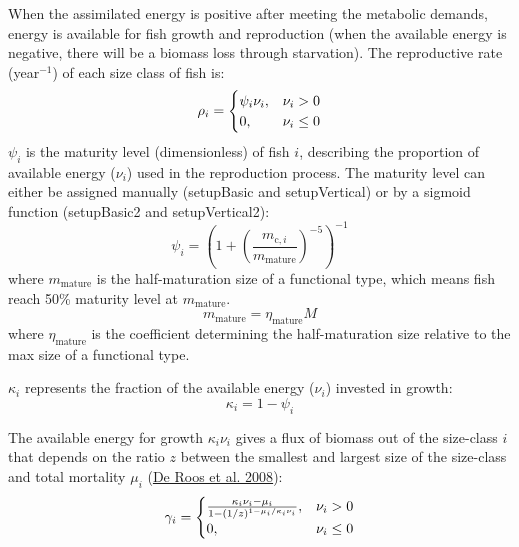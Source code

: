 \documentclass[
]{article}
\begin{document}
When the assimilated energy is positive after meeting the metabolic
demands, energy is available for fish growth and reproduction (when the
available energy is negative, there will be a biomass loss through
starvation). The reproductive rate (year\(^{-1}\)) of each size class of
fish is: \begin{equation}
\rho_i =
  \begin{cases}
 \psi_i \nu_i, & \text{$ \nu_i > 0 $}   \\
     0, & \text{$ \nu_i \leq 0 $} 
  \end{cases}
\end{equation} \(\psi_i\) is the maturity level (dimensionless) of fish
\(i\), describing the proportion of available energy (\(\nu_{i}\)) used
in the reproduction process. The maturity level can either be assigned
manually (setupBasic and setupVertical) or by a sigmoid function
(setupBasic2 and setupVertical2): \begin{equation}
\psi_i = \left(1+\left(\frac{m_{\mathrm{c},i}}{m_{\mathrm{mature}}}\right)^{-5} \right)^{-1}
\end{equation} where \(m_{\mathrm{mature}}\) is the half-maturation size
of a functional type, which means fish reach 50\% maturity level at
\(m_{\mathrm{mature}}\). \begin{equation}
m_{\mathrm{mature}} = \eta_{\mathrm{mature}} M
\end{equation} where \(\eta_{\mathrm{mature}}\) is the coefficient
determining the half-maturation size relative to the max size of a
functional type.

\(\kappa_{i}\) represents the fraction of the available energy
(\(\nu_{i}\)) invested in growth: \begin{equation}
\kappa_i = 1 - \psi_i
\end{equation}

The available energy for growth \(\kappa_i \nu_i\) gives a flux of
biomass out of the size-class \(i\) that depends on the ratio \(z\)
between the smallest and largest size of the size-class and total
mortality \(\mu_i\) (\protect\hyperlink{ref-deRoos2008}{De Roos et al.
2008}): \begin{equation}
 \gamma_i =
  \begin{cases}
\frac{ \kappa_i \nu_i - \mu_i }{1-(1/z)^{1-\mu_i/\kappa_i \nu_i}}, & \text{$ \nu_i > 0 $}   \\
     0, & \text{$ \nu_i \leq 0 $} 
  \end{cases}
\end{equation}
\end{document}
